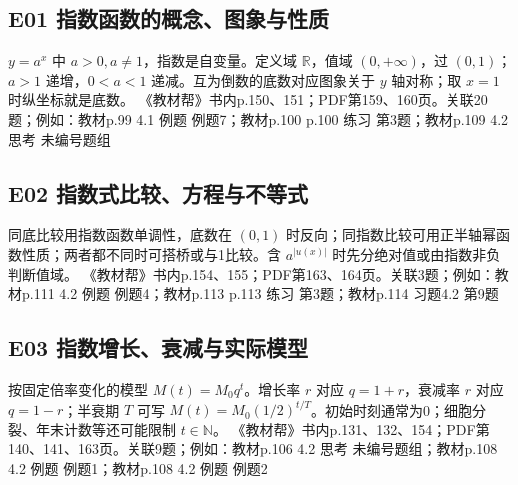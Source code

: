 \par\medskip\noindent\begin{minipage}{\linewidth}\subsection{E01 指数函数的概念、图象与性质}
$y=a^x$ 中 $a>0,a\ne1$，指数是自变量。定义域 $\mathbb R$，值域 $(0,+\infty)$，过 $(0,1)$；$a>1$ 递增，$0<a<1$ 递减。互为倒数的底数对应图象关于 $y$ 轴对称；取 $x=1$ 时纵坐标就是底数。
{\small 《教材帮》书内p.150、151；PDF第159、160页。关联20题；例如：教材p.99 4.1 例题 例题7；教材p.100 p.100 练习 第3题；教材p.109 4.2 思考 未编号题组}\par\end{minipage}\par
\par\medskip\noindent\begin{minipage}{\linewidth}\subsection{E02 指数式比较、方程与不等式}
同底比较用指数函数单调性，底数在 $(0,1)$ 时反向；同指数比较可用正半轴幂函数性质；两者都不同时可搭桥或与1比较。含 $a^{|u(x)|}$ 时先分绝对值或由指数非负判断值域。
{\small 《教材帮》书内p.154、155；PDF第163、164页。关联3题；例如：教材p.111 4.2 例题 例题4；教材p.113 p.113 练习 第3题；教材p.114 习题4.2 第9题}\par\end{minipage}\par
\par\medskip\noindent\begin{minipage}{\linewidth}\subsection{E03 指数增长、衰减与实际模型}
按固定倍率变化的模型 $M(t)=M_0q^t$。增长率 $r$ 对应 $q=1+r$，衰减率 $r$ 对应 $q=1-r$；半衰期 $T$ 可写 $M(t)=M_0(1/2)^{t/T}$。初始时刻通常为0；细胞分裂、年末计数等还可能限制 $t\in\mathbb N$。
{\small 《教材帮》书内p.131、132、154；PDF第140、141、163页。关联9题；例如：教材p.106 4.2 思考 未编号题组；教材p.108 4.2 例题 例题1；教材p.108 4.2 例题 例题2}\par\end{minipage}\par

